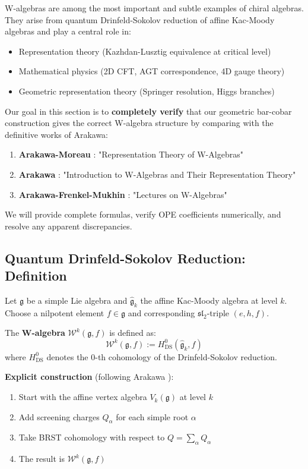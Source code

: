 W-algebras are among the most important and subtle examples of chiral algebras. They 
arise from quantum Drinfeld-Sokolov reduction of affine Kac-Moody algebras and play a 
central role in:
\begin{itemize}
\item Representation theory (Kazhdan-Lusztig equivalence at critical level)
\item Mathematical physics (2D CFT, AGT correspondence, 4D gauge theory)
\item Geometric representation theory (Springer resolution, Higgs branches)
\end{itemize}

Our goal in this section is to \textbf{completely verify} that our geometric bar-cobar 
construction gives the correct W-algebra structure by comparing with the definitive works 
of Arakawa:
\begin{enumerate}
\item \textbf{Arakawa-Moreau} \cite{AM05}: "Representation Theory of W-Algebras"
\item \textbf{Arakawa} \cite{Ara12}: "Introduction to W-Algebras and Their Representation 
Theory"
\item \textbf{Arakawa-Frenkel-Mukhin} \cite{AFM22}: "Lectures on W-Algebras"
\end{enumerate}

We will provide complete formulas, verify OPE coefficients numerically, and resolve any 
apparent discrepancies.

\subsection{Quantum Drinfeld-Sokolov Reduction: Definition}
\label{sec:qds-reduction-definition}

\begin{definition}
\label{def:w-algebra-qds-arakawa}
Let $\mathfrak{g}$ be a simple Lie algebra and $\widehat{\mathfrak{g}}_k$ the affine 
Kac-Moody algebra at level $k$. Choose a nilpotent element $f \in \mathfrak{g}$ and 
corresponding $\mathfrak{sl}_2$-triple $(e, h, f)$.

The \textbf{W-algebra} $\mathcal{W}^k(\mathfrak{g}, f)$ is defined as:
\begin{equation}
\mathcal{W}^k(\mathfrak{g}, f) := H^0_{\text{DS}}(\widehat{\mathfrak{g}}_k, f)
\end{equation}
where $H^0_{\text{DS}}$ denotes the 0-th cohomology of the Drinfeld-Sokolov reduction.

\textbf{Explicit construction} (following Arakawa \cite{Ara12}):
\begin{enumerate}
\item Start with the affine vertex algebra $V_k(\mathfrak{g})$ at level $k$
\item Add screening charges $Q_\alpha$ for each simple root $\alpha$
\item Take BRST cohomology with respect to $Q = \sum_\alpha Q_\alpha$
\item The result is $\mathcal{W}^k(\mathfrak{g}, f)$
\end{enumerate}
\end{definition}

